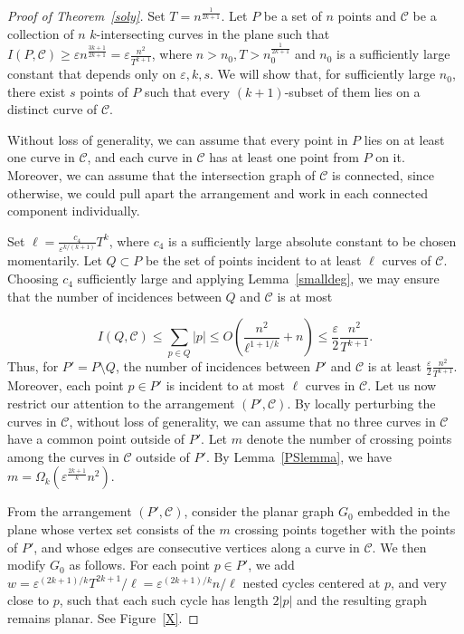 \documentclass[10pt,a4paper]{amsart}
\begin{document}
\begin{proof}[Proof of Theorem~\ref{soly}]
Set $T=n^{\frac{1}{2k+1}}$. Let $P$ be a set of $n$ points and $\mathcal{C}$ be a collection of $n$ $k$-intersecting curves in the plane such that $I(P,\mathcal{C}) \geq \varepsilon n^{\frac{3k + 1}{2k + 1}}=\varepsilon \frac{n^2}{T^{k+1}}$, where $n > n_0,T>n^{\frac{1}{2k+1}}_0$ and $n_0$ is a sufficiently large constant that depends only on $\varepsilon, k, s$. We will show that, for sufficiently large \(n_0\), there exist \(s\) points of \(P\) such that every \((k + 1)\)-subset of them lies on a distinct curve of \(\mathcal C\). 


Without loss of generality, we can assume that every point in $P$ lies on at least one curve in $\mathcal{C}$, and each curve in $\mathcal{C}$ has at least one point from $P$ on it.  
Moreover, we can assume that the intersection graph of $\mathcal{C}$ is connected, since otherwise, we could pull apart the arrangement and work in each connected component individually.  

Set \(\ell=\frac{c_4 }{\varepsilon^{k/(k+1)}}T^k\), where \(c_4\) is a sufficiently large absolute constant to be chosen momentarily. Let \(Q\subset P\) be the set of points incident to at least \(\ell\) curves of \(\mathcal C\). Choosing \(c_4\) sufficiently large and applying Lemma~\ref{smalldeg}, we may ensure that the number of incidences between \(Q\) and \(\mathcal C\) is at most

$$I(Q,\mathcal C) \leq \sum\limits_{p \in Q}|p| \leq O\left(\frac{n^2}{\ell^{1 + 1/k}} + n\right) \leq \frac{\varepsilon}{2} \frac{n^2}{T^{k+1}}.$$  Thus, for $P'   = P\setminus Q$, the number of incidences between $P'$ and $\mathcal C$ is at least $\frac{\varepsilon}{2} \frac{n^2}{T^{k+1}}$.  Moreover, each point $p \in P'$ is incident to at most $\ell$ curves in $\mathcal{C}$.  Let us now restrict our attention to the arrangement $(P', \mathcal C)$.  By locally perturbing the curves in $\mathcal C$, without loss of generality, we can assume that no three curves in $\mathcal{C}$ have a common point outside of $P'$.
Let $m$ denote the number of crossing points among the curves in $\mathcal{C}$ outside of $P'$.  
By Lemma~\ref{PSlemma}, we have $m=\Omega_k\!\left(\varepsilon^{\frac{2k+1}{k}}n^2\right)$.  

From the arrangement $(P',\mathcal{C})$, consider the planar graph $G_0$ embedded in the plane whose vertex set consists of the $m$ crossing points together with the points of $P'$, and whose edges are consecutive vertices along a curve in $\mathcal{C}$.  
We then modify $G_0$ as follows.  For each point $p \in P'$, we add $w = \varepsilon^{(2k + 1)/k}T^{2k+1}/\ell=\varepsilon^{(2k + 1)/k}n/\ell$ nested cycles centered at $p$, and very close to $p$, such that each such cycle has length $2|p|$ and the resulting graph remains planar.   See Figure~\ref{X}.  






\end{proof}
\end{document}
